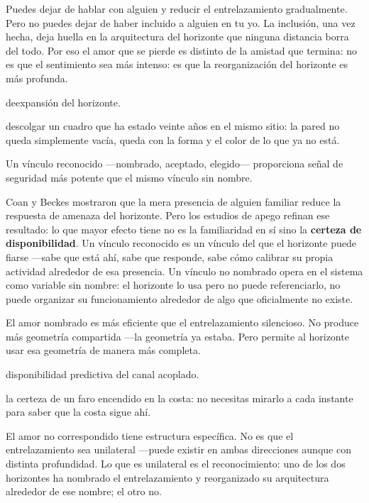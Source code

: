 Puedes dejar de hablar con alguien y reducir el entrelazamiento gradualmente. Pero no puedes dejar de haber incluido a alguien en tu yo. La inclusión, una vez hecha, deja huella en la arquitectura del horizonte que ninguna distancia borra del todo. Por eso el amor que se pierde es distinto de la amistad que termina: no es que el sentimiento sea más intenso: es que la reorganización del horizonte es más profunda.

\begin{fisica}
 deexpansión del horizonte.

 descolgar un cuadro que ha estado veinte años en el mismo sitio: la pared no queda simplemente vacía, queda con la forma y el color de lo que ya no está.
\end{fisica}
\noindent Un vínculo reconocido —nombrado, aceptado, elegido— proporciona señal de seguridad más potente que el mismo vínculo sin nombre.

Coan y Beckes mostraron que la mera presencia de alguien familiar reduce la respuesta de amenaza del horizonte. Pero los estudios de apego refinan ese resultado: lo que mayor efecto tiene no es la familiaridad en sí sino la \textbf{certeza de disponibilidad}. Un vínculo reconocido es un vínculo del que el horizonte puede fiarse —sabe que está ahí, sabe que responde, sabe cómo calibrar su propia actividad alrededor de esa presencia. Un vínculo no nombrado opera en el sistema como variable sin nombre: el horizonte lo usa pero no puede referenciarlo, no puede organizar su funcionamiento alrededor de algo que oficialmente no existe.

El amor nombrado es más eficiente que el entrelazamiento silencioso. No produce más geometría compartida —la geometría ya estaba. Pero permite al horizonte usar esa geometría de manera más completa.

\begin{fisica}
 disponibilidad predictiva del canal acoplado.

 la certeza de un faro encendido en la costa: no necesitas mirarlo a cada instante para saber que la costa sigue ahí.
\end{fisica}
\noindent El amor no correspondido tiene estructura específica. No es que el entrelazamiento sea unilateral —puede existir en ambas direcciones aunque con distinta profundidad. Lo que es unilateral es el reconocimiento: uno de los dos horizontes ha nombrado el entrelazamiento y reorganizado su arquitectura alrededor de ese nombre; el otro no.

